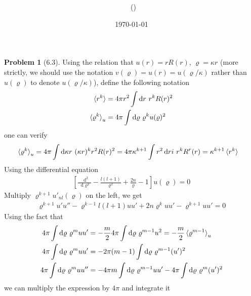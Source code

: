 \documentclass[twoside,11pt]{article}
\title{{\lms \Code \ \Ass}}
\author{\lms \name \ (\href{mailto:\mail}{\mail})}
\date{\sffamily \today}
\makeatletter
\renewcommand*\d{\mathop{}\!\mathrm{d}}
\theoremstyle{definition}
\newtheorem{problem}{Problem}
\theoremstyle{remark}
\newtheorem*{remark}{Remark}
\renewcommand{\maketitle}{\bgroup\setlength{\parindent}{0pt}
\begin{flushleft}
  \textbf{\Large\@title}

  \@author
\end{flushleft}\egroup
}
\makeatother
\begin{document}
\maketitle
\thispagestyle{title}


\begin{problem}[6.3]
Using the relation that $u(r) = rR(r)$, $\varrho=\kappa r$
(more strictly, we should use the notation $v(\varrho)=u(r)=u(\varrho/\kappa)$ rather than $u(\varrho)$
to denote $u(\varrho/\kappa)$),
define the following notation
\begin{align*}
    \braket{r^k} &= 4\pi r^2\int\d r\ r^k R(r)^2\\
    \braket{\varrho^k}_u &= 4\pi\int\d \varrho\ \varrho^k u(\varrho)^2
\end{align*}
one can verify
\begin{align*}
    \braket{\varrho^k}_u &= 4\pi\int\d \kappa r\ (\kappa r)^k r^2 R(r)^2
    =4\pi\kappa^{k+1} \int r^2\d ri\ r^kR^r(r) = \kappa^{k+1}\braket{r^k}
\end{align*}
Using the differential equation
\begin{align}
    \left[
        \frac{\d^2}{\d\varrho^2} - \frac{l(l+1)}{\varrho^2} + \frac{2n}{\varrho} - 1
    \right]u(\varrho) = 0
\end{align}
Multiply $\varrho^{k+1}u'_{nl}(\varrho)$ on the left, we get
\begin{align*}
    \varrho^{k+1}u'u'' - \varrho^{k-1}l(l+1)uu' + 2n\varrho^k uu' - \varrho^{k+1}uu' = 0
\end{align*}
Using the fact that
\begin{align*}
    4\pi\int\d\varrho\ \varrho^m uu' &= -\frac{m}{2}4\pi\int\d\varrho\ \varrho^{m-1}u^2
    = -\frac{m}{2}\braket{\varrho^{m-1}}_u\\
    4\pi\int\d\varrho\ \varrho^m uu' &= -2\pi(m-1)\int\d\varrho\ \varrho^{m-1} (u')^2\\
    4\pi\int\d\varrho\ \varrho^m uu'' &= -4\pi m\int\d\varrho\ \varrho^{m-1}uu' -4\pi\int\d\varrho\
    \varrho^m (u')^2
\end{align*}
we can multiply the expression by $4\pi$ and integrate it

\end{problem}
\end{document}
